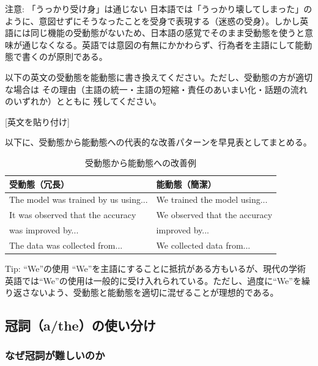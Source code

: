 \begin{itembox}[l]{注意: 「うっかり受け身」は通じない}
日本語では「うっかり壊してしまった」のように、意図せずにそうなったことを受身で表現する（迷惑の受身）。しかし英語には同じ機能の受動態がないため、日本語の感覚でそのまま受動態を使うと意味が通じなくなる。英語では意図の有無にかかわらず、行為者を主語にして能動態で書くのが原則である。
\end{itembox}

\begin{promptbox}
以下の英文の受動態を能動態に書き換えてください。ただし、受動態の方が適切な場合は
その理由（主語の統一・主語の短縮・責任のあいまい化・話題の流れのいずれか）とともに
残してください。

{[}英文を貼り付け]
\end{promptbox}

以下に、受動態から能動態への代表的な改善パターンを早見表としてまとめる。

\begin{table}[htbp]
\centering
\caption{受動態から能動態への改善例}
\label{tab:passive}
\footnotesize
\begin{tabular}{ll}
\toprule
受動態（冗長） & 能動態（簡潔） \\
\midrule
The model was trained by us using... & We trained the model using... \\
It was observed that the accuracy & We observed that the accuracy \\
\quad was improved by... & \quad improved by... \\
The data was collected from... & We collected data from... \\
\bottomrule
\end{tabular}
\end{table}

\begin{itembox}[l]{Tip: ``We''の使用}
``We''を主語にすることに抵抗がある方もいるが、現代の学術英語では``We''の使用は一般的に受け入れられている。ただし、過度に``We''を繰り返さないよう、受動態と能動態を適切に混ぜることが理想的である。
\end{itembox}

\subsection{冠詞（a/the）の使い分け}
\label{subsec:articles}

\subsubsection{なぜ冠詞が難しいのか}

